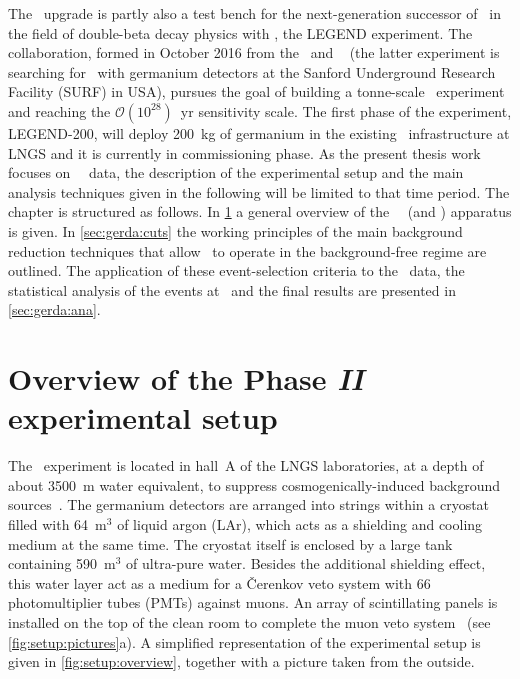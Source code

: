 \newpar
The \phasetwop\ upgrade is partly also a test bench for the next-generation successor of
\gerda\ in the field of double-beta decay physics with \gesix, the LEGEND experiment. The
collaboration, formed in October 2016 from the \gerda\ and \majorana~\cite{Abgrall2014}
(the latter experiment is searching for \onbb\ with germanium detectors at the Sanford
Underground Research Facility (SURF) in USA), pursues the goal of building a tonne-scale
\gesix\ experiment and reaching the $\mathcal{O}(10^{28})$~yr sensitivity scale. The first
phase of the experiment, LEGEND-200, will deploy 200~kg of germanium in the existing \gerda\
infrastructure at LNGS and it is currently in commissioning phase.
\newpar
As the present thesis work focuses on \gerda\ \phasetwo\ data, the description of the
experimental setup and the main analysis techniques given in the following will be limited
to that time period. The chapter is structured as follows. In \cref{sec:gerda:setup} a
general overview of the \gerda\ \phasetwo\ (and \phasetwop) apparatus is given. In
\cref{sec:gerda:cuts} the working principles of the main background reduction techniques
that allow \gerda\ to operate in the background-free regime are outlined. The application
of these event-selection criteria to the \phasetwo\ data, the statistical analysis of the
events at \qbb\ and the final results are presented in \cref{sec:gerda:ana}.

\section{Overview of the Phase {\normalfont\textit{II}} experimental setup}%
\label{sec:gerda:setup}

The \gerda\ experiment is located in hall~A of the LNGS laboratories, at a depth of about
3500~m water equivalent, to suppress cosmogenically-induced background
sources~\cite{Wiesinger2018}. The germanium detectors are arranged into strings within a
cryostat filled with 64~m$^3$ of liquid argon (LAr), which acts as a shielding and cooling
medium at the same time. The cryostat itself is enclosed by a large tank containing
590~m$^3$ of ultra-pure water.  Besides the additional shielding effect, this water layer
act as a medium for a \v{C}erenkov veto system with 66 photomultiplier tubes (PMTs)
against muons. An array of scintillating panels is installed on the top of the clean room
to complete the muon veto system~\cite{Freund2016} (see \cref{fig:setup:pictures}a). A
simplified representation of the experimental setup is given in \cref{fig:setup:overview},
together with a picture taken from the outside.

